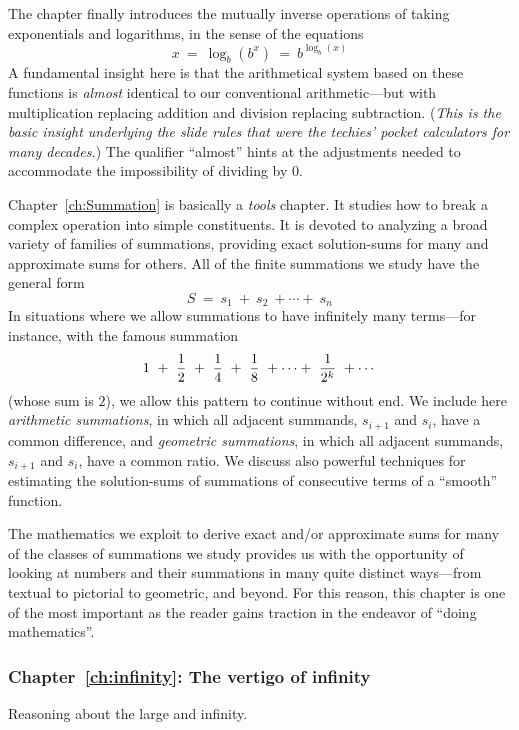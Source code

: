The chapter finally introduces the mutually inverse operations of
taking exponentials and logarithms, in the sense of the equations
\[  x \ = \ \log_b(b^x) \ = \ b^{\log_b(x)} \]
A fundamental insight here is that the arithmetical system based on
these functions is {\em almost} identical to our conventional
arithmetic---but with multiplication replacing addition and division
replacing subtraction.  ({\em This is the basic insight underlying the
  {\em slide rules} that were the techies' pocket calculators for many
  decades.})  The qualifier ``almost'' hints at the adjustments needed
to accommodate the impossibility of dividing by $0$.

\bigskip

Chapter~\ref{ch:Summation} is basically a {\em tools} chapter. 
It studies how to break a complex operation into simple constituents.
It is devoted to analyzing a broad variety of families of summations,
providing exact solution-sums for many and approximate sums for
others.  All of the finite summations we study have the general form
\[ S \ = \ s_1 \ + \ s_2 \ + \cdots + \ s_n \]
In situations where we allow summations to have infinitely many
terms---for instance, with the famous summation
\[ 1 \ + \ {1 \over 2} \ + \ {1 \over 4} \ + \ {1 \over 8} \ + \cdots
+ \ {1 \over {2^k}} \ + \cdots
\]
(whose sum is $2$), we allow this pattern to continue without end.  We
include here {\it arithmetic summations}, in which all adjacent
summands, $s_{i+1}$ and $s_i$, have a common difference, and {\it
  geometric summations}, in which all adjacent summands, $s_{i+1}$ and
$s_i$, have a common ratio.  We discuss also powerful techniques for
estimating the solution-sums of summations of consecutive terms of a
``smooth'' function.

The mathematics we exploit to derive exact and/or approximate sums for
many of the classes of summations we study provides us with the
opportunity of looking at numbers and their summations in many quite
distinct ways---from textual to pictorial to geometric, and beyond.
For this reason, this chapter is one of the most important as the
reader gains traction in the endeavor of ``doing mathematics''.


\subsubsection{Chapter~\ref{ch:infinity}: The vertigo of infinity}

Reasoning about the large and infinity.


